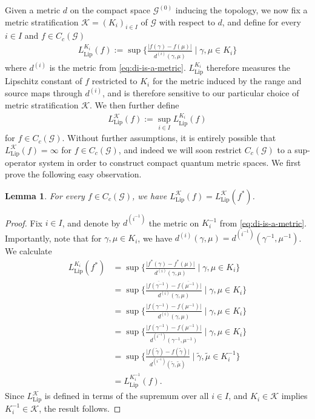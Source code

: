\documentclass[11pt,a4paper,oneside,final,reqno]{amsart}
\newtheorem{lemma}{Lemma}[section]
\theoremstyle{definition}
\newcommand{\G}{\mathcal{G}}
\newcommand{\Go}{\mathcal{G}^{(0)}}
\newcommand{\cK}{\mathcal{K}}
\numberwithin{equation}{section}
\begin{document}
	
	
	Given a metric $d$ on the compact space $\Go$ 
	inducing the topology,  
	we now fix a metric stratification $\cK = (K_i)_{i \in I}$ of $\G$ with respect to $d$, and define for every $i \in I$ and $f \in C_c(\G)$
		\begin{align*}
		L_{\mathrm{Lip}}^{K_i}(f) := \sup \{ \frac{\vert f(\gamma) - f(\mu) \vert}{d^{(i)}(\gamma, \mu)} \mid \gamma,\mu \in K_i   \}
	\end{align*}
	where $d^{(i)}$ is the metric from \eqref{eq:di-is-a-metric}.  $L_{\mathrm{Lip}}^{K_i}$ therefore measures the Lipschitz constant of $f$ restricted to $K_i$ for the metric induced by the range and source maps through $d^{(i)}$, and is therefore 
	sensitive to our particular choice of metric stratification $\cK$. 
	We then further define
	\begin{align}\label{eq:def-decomposition-Lipschitz-norm}
		L^{\cK}_{\mathrm{Lip}}(f) :=  \sup_{i \in I}   L^{K_i}_{\mathrm{Lip}}(f) 
	\end{align}
	for $f \in C_c(\G)$. Without further assumptions, it is entirely possible that $L^{\cK}_{\mathrm{Lip}}(f) = \infty$ for $f \in C_c(\G)$, and indeed we will soon restrict $C_c(\G)$ to a sup-operator system in order to construct compact quantum metric spaces. We first prove the following easy observation.

	\begin{lemma}\label{lemma:LK-selfadjoint}
		For every $f \in C_c (\G)$, we have $L^{\cK}_{\mathrm{Lip}}(f) = L^{\cK}_{\mathrm{Lip}}(f^*)$. 
	\end{lemma}
	
	\begin{proof}
		Fix $i \in I$, and denote by $d^{(i^{-1})}$ the metric on $K_i^{-1}$ from \eqref{eq:di-is-a-metric}. Importantly, note that for $\gamma, \mu \in K_i$, we have $d^{(i)}(\gamma, \mu) = d^{(i^{-1})}(\gamma^{-1}, \mu^{-1})$. We calculate
		\begin{align*}
			L_\mathrm{Lip}^{K_i}(f^*) &= \sup \{ \frac{\vert f^*(\gamma) - f^*(\mu)\vert}{d^{(i)}(\gamma, \mu)} \mid \gamma, \mu \in K_i  \} \\
			&= \sup \{ \frac{\vert \overline{f(\gamma^{-1})} - \overline{f(\mu^{-1})}\vert}{d^{(i)}(\gamma, \mu)} \mid \gamma, \mu \in K_i   \} \\
			&= \sup \{ \frac{\vert f(\gamma^{-1}) - f(\mu^{-1})\vert}{d^{(i)}(\gamma, \mu)} \mid \gamma, \mu \in K_i   \} \\
			&= \sup \{ \frac{\vert f(\gamma^{-1}) - f(\mu^{-1})\vert}{d^{(i^{-1})}(\gamma^{-1}, \mu^{-1})} \mid \gamma, \mu \in K_i  \} \\
			&= \sup \{ \frac{\vert f(\tilde{\gamma}) - f(\tilde{\gamma})\vert}{d^{(i^{-1})}(\tilde{\gamma}, \tilde{\mu})} \mid \tilde{\gamma}, \tilde{\mu} \in K_i^{-1}  \} \\
			&= L^{K_i^{-1}}_{\mathrm{Lip}}(f).
		\end{align*}
		Since $L^{\cK}_{\mathrm{Lip}}$ is defined in terms of the supremum over all $i \in I$, and $K_i \in \cK$ implies $K_i^{-1} \in \cK$, 
		the result follows. 
	\end{proof}
	
\end{document}
